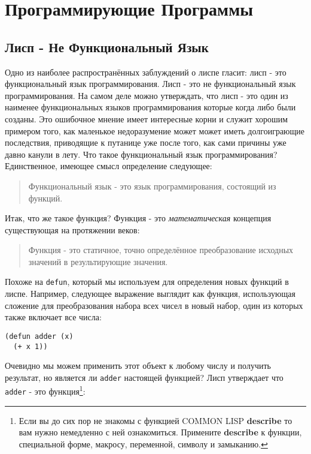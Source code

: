\chapter{Программирующие Программы}\label{chapter_programs_that_program}
\section{Лисп - Не Функциональный Язык}\label{section_lisp_is_not_functional}

Одно из наиболее распространённых заблуждений о лиспе гласит: лисп - это функциональный язык программирования. Лисп - это не функциональный язык программирования. На самом деле можно утверждать, что лисп - это один из наименее функциональных языков программирования которые когда либо были созданы. Это ошибочное мнение имеет интересные корни и служит хорошим примером того, как маленькое недоразумение может может иметь долгоиграющие последствия, приводящие к путанице уже после того, как сами причины уже давно канули в лету. Что такое функциональный язык программирования? Единственное, имеющее смысл определение следующее:

\begin{quote}
Функциональный язык - это язык программирования, состоящий из функций.
\end{quote}
 
Итак, что же такое функция? Функция - это \emph{математическая} концепция существующая на протяжении веков: 
 
\begin{quote}
Функция - это статичное, точно определённое преобразование исходных значений в результирующие значения. 
\end{quote}
 
Похоже на \verb"defun", который мы используем для определения новых функций в лиспе. Например, следующее выражение выглядит как функция, использующая сложение для преобразования набора всех чисел в новый набор, один из которых также включает все числа: 
 
\begin{verbatim}
(defun adder (x)
  (+ x 1))
\end{verbatim}
 
Очевидно мы можем применить этот объект к любому числу и получить результат, но является ли \verb"adder" настоящей функцией? Лисп утверждает что \verb"adder" - это функция\footnote{Если вы до сих пор не знакомы с функцией COMMON LISP \textbf{describe} то вам нужно немедленно с ней ознакомиться. Примените \textbf{describe} к функции, специальной форме, макросу, переменной, символу и замыканию.}: 

